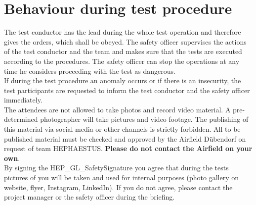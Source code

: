 \documentclass{article}
\begin{document}
\section{Behaviour during test procedure}
The test conductor has the lead during the whole test operation and therefore gives the orders, which shall be obeyed. The safety officer supervises the actions of the test conductor and the team and makes sure that the tests are executed according to the procedures. The safety officer can stop the operations at any time he considers proceeding with the test as dangerous. \\
\noindent
If during the test procedure an anomaly occurs or if there is an insecurity, the test participants are requested to inform the test conductor and the safety officer immediately. \\
\noindent
The attendees are not allowed to take photos and record video material. A pre-determined photographer will take pictures and video footage. The publishing of this material via social media or other channels is strictly forbidden. All to be published material must be checked and approved by the Airfield Dübendorf on request of team HEPHAESTUS. \textbf{Please do not contact the Airfield on your own}. \\
\noindent
By signing the HEP\_GL\_SafetySignature you agree that during the tests pictures of you will be taken and used for internal purposes (photo gallery on website, flyer, Instagram, LinkedIn). If you do not agree, please contact the project manager or the safety officer during the briefing.
\end{document}
